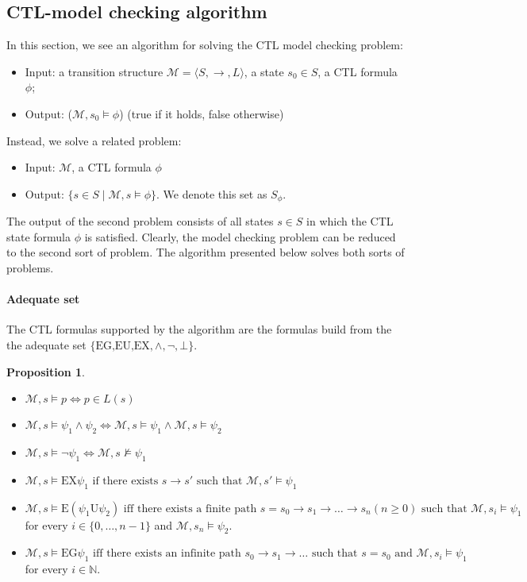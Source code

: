 \documentclass[10pt,a4paper]{article}
\theoremstyle{definition}
\newtheorem{proposition}{Proposition}[theorem]
\let\iff\Leftrightarrow
\begin{document}
\subsection{CTL-model checking algorithm}

In this section, we see an algorithm for solving the CTL model checking problem:
\begin{itemize}
	\item Input: a transition structure $\mathcal{M} = \langle S,\rightarrow,L \rangle$, a state $s_0 \in S$, a CTL formula $\phi$;
	\item Output: ($\mathcal{M}, s_0 \models \phi$) (true if it holds, false otherwise)
\end{itemize}

Instead, we solve a related problem:
\begin{itemize}
	\item Input: $\mathcal{M}$, a CTL formula $\phi$
	\item Output: $\{s \in S \mid \mathcal{M}, s \models \phi\}$. We denote this set as $S_\phi$.
\end{itemize}

The output of the second problem consists of all states $s \in S$ in which the CTL state formula $\phi$ is satisfied. Clearly, the model checking problem can be reduced to the second sort of problem. The algorithm presented below solves both sorts of problems.

\paragraph{Adequate set}  The CTL formulas supported by the algorithm are the formulas build from the the adequate set $\{\text{EG,EU,EX}, \land, \lnot, \bot\}$.

\begin{proposition}
\begin{itemize}
	\item $\mathcal{M}, s \models p \iff p \in L(s)$
	\item $\mathcal{M}, s \models \psi_1 \land \psi_2 \iff \mathcal{M}, s \models \psi_1 \land \mathcal{M}, s \models \psi_2$
	\item $\mathcal{M}, s \models \lnot \psi_1 \iff \mathcal{M}, s \not\models \psi_1$
	\item $\mathcal{M}, s \models \text{EX} \psi_1 \text{ if there exists $s \rightarrow s'$ such that } \mathcal{M}, s' \models \psi_1$
	\item $\mathcal{M}, s \models \text{E} (\psi_1 \text{U} \psi_2) \text{ iff there exists a finite path $s = s_0 \rightarrow s_1 \rightarrow \dots \rightarrow s_n (n \geq 0)$ such that } \mathcal{M}, s_i \models \psi_1$ for every $i \in \{0,\dots,n-1\}$ and $\mathcal{M}, s_n \models \psi_2$.
	\item $\mathcal{M}, s \models \text{EG} \psi_1 \text{ iff there exists an infinite path $s_0 \rightarrow s_1 \rightarrow \dots$ such that } s = s_0 \text{ and } \mathcal{M}, s_i \models \psi_1$ for every $i \in \mathbb{N}$.
\end{itemize}
\end{proposition}
\end{document}
